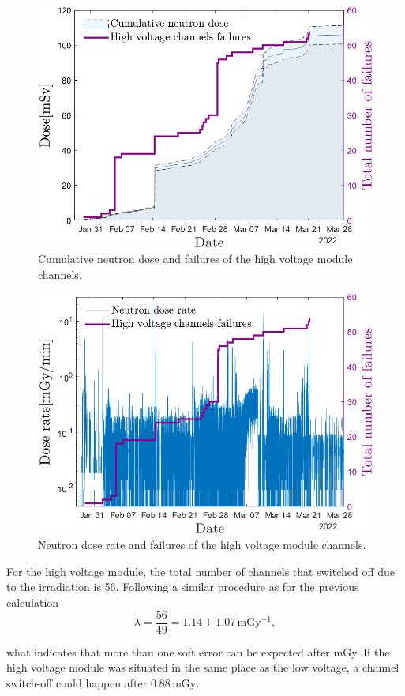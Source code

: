 \begin{figure}[!h]
    \centering
    \includegraphics[width=0.6\columnwidth]{Chapter4/images/HV_failure_and_neutronrate.png}
    \caption{Cumulative neutron dose and failures of the high voltage module channels.}
    \label{fig:hv_neutrons}
\end{figure}
\begin{figure}[!h]
    \centering
    \includegraphics[width=0.6\columnwidth]{Chapter4/images/Hv_neutrons_dose_rate.png}
    \caption{Neutron dose rate and failures of the high voltage module channels.}
    \label{fig:hv_neutrons_rate}
\end{figure}

For the high voltage module, the total number of channels that switched off due to the irradiation is 56. Following a similar procedure as for the previous calculation
  \begin{equation}
 \lambda = \frac{56}{49} = 1.14\pm 1.07\,\mathrm{mGy^{-1}},
\end{equation}

what indicates that more than one soft error can be expected after mGy. 
If the high voltage module was situated in the same place as the low voltage, a channel switch-off could happen after $0.88\mathrm{\,mGy}$. 



